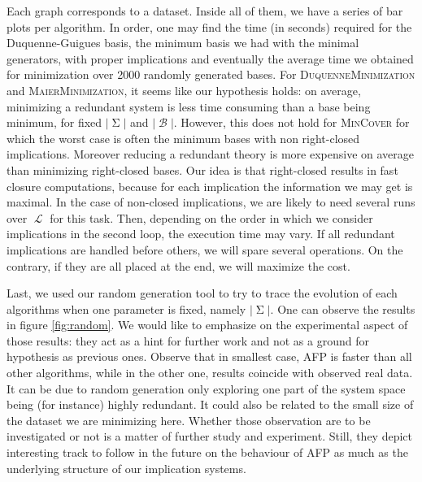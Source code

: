 \documentclass[runningheads]{llncs}
\DeclareMathOperator{\I}{\mathcal{L}}  %
\DeclareMathOperator{\Sg}{\Sigma}  %
\DeclareMathOperator{\B}{\mathcal{B}}
\begin{document}
\begin{figure}
	
\end{figure}

Each graph corresponds to a dataset. Inside all of them, we have a series
of bar plots per algorithm. In order, one may find the time (in seconds) required for the Duquenne-Guigues basis, the minimum basis we had with the
minimal generators, with proper implications and eventually the average
time we obtained for minimization over 2000 randomly generated bases. For \textsc{DuquenneMinimization} and \textsc{MaierMinimization}, it seems like
our hypothesis holds: on average, minimizing a redundant system is less time consuming than a base being minimum, for fixed $|\Sg|$ and $|\B|$. However,
this does not hold for \textsc{MinCover} for which the worst case is often
the minimum bases with non right-closed implications. Moreover reducing a redundant theory is more expensive on average than minimizing right-closed
bases. Our idea is that right-closed results in fast closure computations, because for each implication the information we may get is maximal. In the
case of non-closed implications, we are likely to need several runs over
$\I$ for this task. Then, depending on the order in which we consider implications in the second loop, the execution time may vary. If all redundant
implications are handled before others, we will spare several operations.
On the contrary, if they are all placed at the end, we will maximize the
cost.

Last, we used our random generation tool to try to trace the evolution of
each algorithms when one parameter is fixed, namely $|\Sg|$. One can observe
the results in figure \ref{fig:random}. We would like to emphasize on the experimental aspect of those results: they act as a hint for further work and not as a ground for hypothesis as previous ones. Observe that in smallest case, \textsc{AFP} is faster than all other algorithms, while in the other one,
results coincide with observed real data. It can be due to random generation only exploring one part of the system space being (for instance) highly redundant. It could also be related to the small size of the dataset we are minimizing here. Whether those observation are to be investigated or not is a matter of further study and experiment. Still, they depict interesting track to
follow in the future on the behaviour of \textsc{AFP} as much as the underlying
structure of our implication systems.
\end{document}
